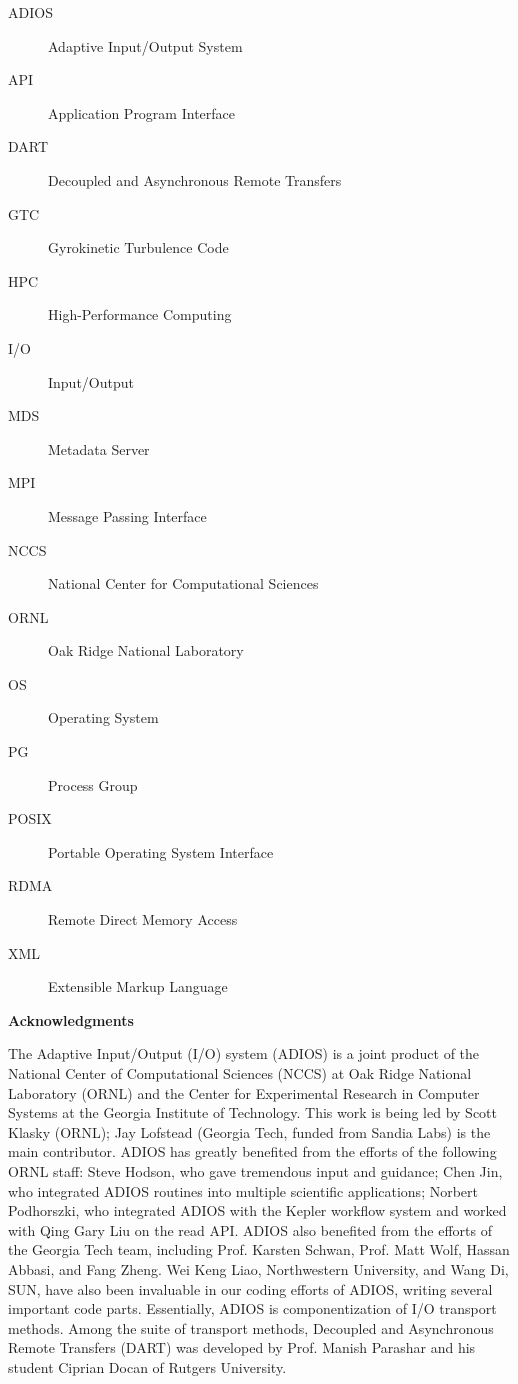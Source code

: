 \begin{description}
\item[ADIOS]  Adaptive Input/Output System
\item[API] Application Program Interface
\item[DART] Decoupled and Asynchronous Remote Transfers
\item[GTC] Gyrokinetic Turbulence Code
\item[HPC] High-Performance Computing
\item[I/O] Input/Output
\item[MDS] Metadata Server
\item[MPI] Message Passing Interface
\item[NCCS] National Center for Computational Sciences
\item[ORNL] Oak Ridge National Laboratory
\item[OS] Operating System
\item[PG] Process Group
\item[POSIX] Portable Operating System Interface
\item[RDMA] Remote Direct Memory Access
\item[XML] Extensible Markup Language
\end{description}


\vspace{18pt}
\begin{center}
{\large \textbf{Acknowledgments}}
\end{center}

\vspace{6pt}
The Adaptive Input/Output (I/O) system (ADIOS) is a joint product of the National 
Center of Computational Sciences (NCCS) at Oak Ridge National Laboratory (ORNL) 
and the Center for Experimental Research in Computer Systems at the Georgia Institute 
of Technology. This work is being led by Scott Klasky (ORNL); Jay Lofstead (Georgia 
Tech, funded from Sandia Labs) is the main contributor. ADIOS has greatly benefited 
from the efforts of the following ORNL staff: Steve Hodson, who gave tremendous 
input and guidance; Chen Jin, who integrated ADIOS routines into multiple scientific 
applications; Norbert Podhorszki, who integrated ADIOS with the Kepler workflow 
system and worked with Qing Gary Liu on the read API. ADIOS also benefited from 
the efforts of the Georgia Tech team, including Prof. Karsten Schwan, Prof. Matt 
Wolf, Hassan Abbasi, and Fang Zheng. Wei Keng Liao, Northwestern University, and 
Wang Di, SUN, have also been invaluable in our coding efforts of ADIOS, writing 
several important code parts. Essentially, ADIOS is componentization of I/O transport 
methods. Among the suite of transport methods, Decoupled and Asynchronous 
Remote Transfers (DART) was developed by Prof. Manish Parashar and his student 
Ciprian Docan of Rutgers University.

